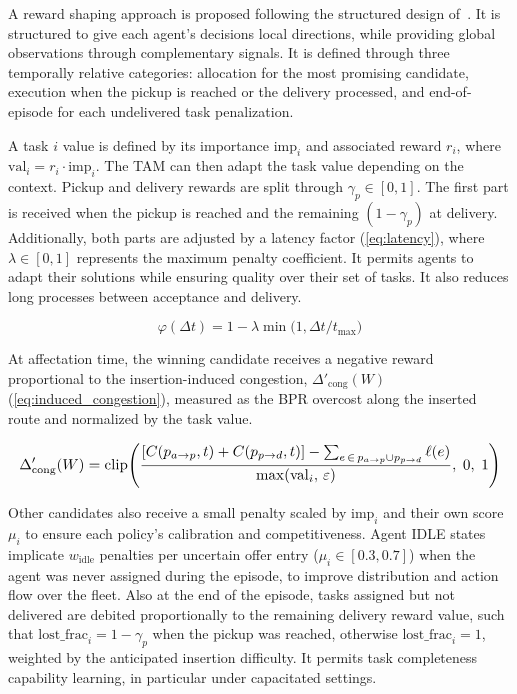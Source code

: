 \documentclass[sigconf]{acmart}
\begin{document}
A reward shaping approach is proposed following the structured design
of~\cite{ng1999}. It is structured to give each agent's decisions local
directions, while providing global observations through complementary
signals. It is defined through three temporally relative categories:
allocation for the most promising candidate, execution when the pickup is
reached or the delivery processed, and end-of-episode for each undelivered
task penalization.

A task $i$ value is defined by its importance $\mathrm{imp}_i$ and
associated reward $r_i$, where $\mathrm{val}_i = r_i \cdot \mathrm{imp}_i$.
The TAM can then adapt the task value depending on the context. Pickup and
delivery rewards are split through $\gamma_p \in [0,1]$. The first part is
received when the pickup is reached and the remaining $(1-\gamma_p)$ at
delivery. Additionally, both parts are adjusted by a latency factor
(\ref{eq:latency}), where $\lambda \in [0,1]$ represents the maximum penalty
coefficient. It permits agents to adapt their solutions while ensuring
quality over their set of tasks. It also reduces long processes between
acceptance and delivery.

\begin{equation}
\varphi(\Delta t) = 1 - \lambda \min\!\bigl(1, \Delta t/t_{\max}\bigr)
\label{eq:latency}
\end{equation}

At affectation time, the winning candidate receives a negative reward
proportional to the insertion-induced congestion, $\Delta'_{\mathrm{cong}}(W)$
(\ref{eq:induced_congestion}), measured as the BPR overcost along the
inserted route and normalized by the task value.

\begin{equation}
\resizebox{\columnwidth}{!}{$\displaystyle
\Delta'_{\mathrm{cong}}(W) = \mathrm{clip}\!\left(
\frac{[C(p_{a\to p},t)+C(p_{p\to d},t)]
      - \sum_{e\,\in\, p_{a\to p}\cup p_{p\to d}} \ell(e)}
     {\max(\mathrm{val}_i,\,\varepsilon)},\;0,\;1\right)
$}
\label{eq:induced_congestion}
\end{equation}

Other candidates also receive a small penalty scaled by $\mathrm{imp}_i$ and
their own score $\mu_i$ to ensure each policy's calibration and
competitiveness. Agent IDLE states implicate $w_{\mathrm{idle}}$ penalties
per uncertain offer entry ($\mu_i \in [0.3, 0.7]$) when the agent was never
assigned during the episode, to improve distribution and action flow over
the fleet. Also at the end of the episode, tasks assigned but not delivered
are debited proportionally to the remaining delivery reward value, such that
$\mathrm{lost\_frac}_i = 1 - \gamma_p$ when the pickup was reached, otherwise
$\mathrm{lost\_frac}_i = 1$, weighted by the anticipated insertion difficulty.
It permits task completeness capability learning, in particular under
capacitated settings.
\end{document}
